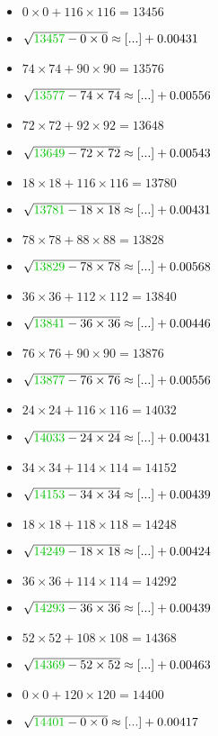 \documentclass[12pt]{article}
\begin{document}
\begin{multicols}{2}
\begin{itemize}
\item $0\times0 + 116\times116 = 13456$
\item $\sqrt{ {\color{green!75!black}{13457}} - 0\times 0 } \approx [...] + 0.00431$
\item $74\times74 + 90\times90 = 13576$
\item $\sqrt{ {\color{green!75!black}{13577}} - 74\times 74 } \approx [...] + 0.00556$
\item $72\times72 + 92\times92 = 13648$
\item $\sqrt{ {\color{green!75!black}{13649}} - 72\times 72 } \approx [...] + 0.00543$
\item $18\times18 + 116\times116 = 13780$
\item $\sqrt{ {\color{green!75!black}{13781}} - 18\times 18 } \approx [...] + 0.00431$
\item $78\times78 + 88\times88 = 13828$
\item $\sqrt{ {\color{green!75!black}{13829}} - 78\times 78 } \approx [...] + 0.00568$
\item $36\times36 + 112\times112 = 13840$
\item $\sqrt{ {\color{green!75!black}{13841}} - 36\times 36 } \approx [...] + 0.00446$
\item $76\times76 + 90\times90 = 13876$
\item $\sqrt{ {\color{green!75!black}{13877}} - 76\times 76 } \approx [...] + 0.00556$
\item $24\times24 + 116\times116 = 14032$
\item $\sqrt{ {\color{green!75!black}{14033}} - 24\times 24 } \approx [...] + 0.00431$
\item $34\times34 + 114\times114 = 14152$
\item $\sqrt{ {\color{green!75!black}{14153}} - 34\times 34 } \approx [...] + 0.00439$
\item $18\times18 + 118\times118 = 14248$
\item $\sqrt{ {\color{green!75!black}{14249}} - 18\times 18 } \approx [...] + 0.00424$
\item $36\times36 + 114\times114 = 14292$
\item $\sqrt{ {\color{green!75!black}{14293}} - 36\times 36 } \approx [...] + 0.00439$
\item $52\times52 + 108\times108 = 14368$
\item $\sqrt{ {\color{green!75!black}{14369}} - 52\times 52 } \approx [...] + 0.00463$
\item $0\times0 + 120\times120 = 14400$
\item $\sqrt{ {\color{green!75!black}{14401}} - 0\times 0 } \approx [...] + 0.00417$

\end{itemize}
\end{multicols}
\end{document}
